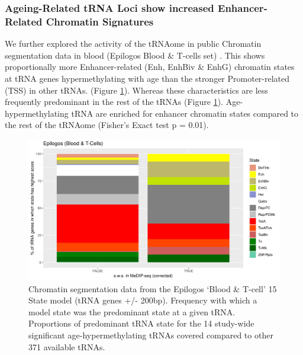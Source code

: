 \documentclass[]{book}
\begin{document}
\hypertarget{ageing-related-trna-loci-show-increased-enhancer-related-chromatin-signatures}{%
\subsubsection{Ageing-Related tRNA Loci show increased Enhancer-Related Chromatin Signatures}\label{ageing-related-trna-loci-show-increased-enhancer-related-chromatin-signatures}}

We further explored the activity of the tRNAome in public Chromatin segmentation data in blood (Epilogos Blood \& T-cells set) \citep{Meuleman2019}.
This shows proportionally more Enhancer-related (Enh, EnhBiv \& EnhG) chromatin states at tRNA genes hypermethylating with age than the stronger Promoter-related (TSS) in other tRNAs. (Figure \ref{fig:combinedEpilogosPlot}).
Whereas these characteristics are less frequently predominant in the rest of the tRNAs (Figure \ref{fig:combinedEpilogosPlot}).
Age-hypermethylating tRNA are enriched for enhancer chromatin states compared to the rest of the tRNAome (Fisher's Exact test p = 0.01).

\begin{figure}

{\centering \includegraphics[width=0.9\linewidth]{./figs/maxScoreBytRNAtRNAge6SplitPlot_BL} 

}

\caption{Chromatin segmentation data from the Epilogos \citep{Meuleman2019} `Blood \& T-cell' 15 State model (tRNA genes +/- 200bp). Frequency with which a model state was the predominant state at a given tRNA. Proportions of predominant tRNA state for the 14 study-wide significant age-hypermethylating tRNAs covered compared to other 371 available tRNAs.}\label{fig:combinedEpilogosPlot}
\end{figure}
\end{document}
